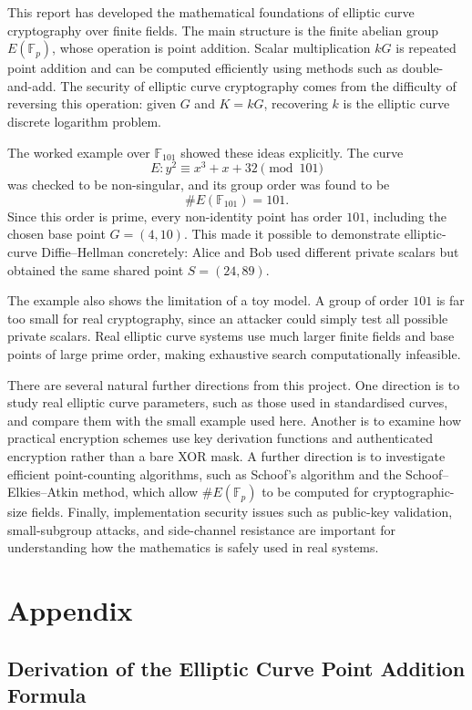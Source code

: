 \documentclass[12pt,a4paper]{article}
\begin{document}
This report has developed the mathematical foundations of elliptic curve cryptography over finite fields. The main structure is the finite abelian group \(E(\mathbb{F}_p)\), whose operation is point addition. Scalar multiplication \(kG\) is repeated point addition and can be computed efficiently using methods such as double-and-add. The security of elliptic curve cryptography comes from the difficulty of reversing this operation: given \(G\) and \(K=kG\), recovering \(k\) is the elliptic curve discrete logarithm problem.

The worked example over \(\mathbb{F}_{101}\) showed these ideas explicitly. The curve
\[E:y^2\equiv x^3+x+32\pmod {101}\]
was checked to be non-singular, and its group order was found to be
\[\#E(\mathbb{F}_{101})=101.\]
Since this order is prime, every non-identity point has order \(101\), including the chosen base point \(G=(4,10)\). This made it possible to demonstrate elliptic-curve Diffie--Hellman concretely: Alice and Bob used different private scalars but obtained the same shared point \(S=(24,89)\).

The example also shows the limitation of a toy model. A group of order \(101\) is far too small for real cryptography, since an attacker could simply test all possible private scalars. Real elliptic curve systems use much larger finite fields and base points of large prime order, making exhaustive search computationally infeasible.

There are several natural further directions from this project. One direction is to study real elliptic curve parameters, such as those used in standardised curves, and compare them with the small example used here. Another is to examine how practical encryption schemes use key derivation functions and authenticated encryption rather than a bare XOR mask. A further direction is to investigate efficient point-counting algorithms, such as Schoof's algorithm and the Schoof--Elkies--Atkin method, which allow \(\#E(\mathbb{F}_p)\) to be computed for cryptographic-size fields. Finally, implementation security issues such as public-key validation, small-subgroup attacks, and side-channel resistance are important for understanding how the mathematics is safely used in real systems.

\printbibliography

\appendix
\section{Appendix}
\subsection{Derivation of the Elliptic Curve Point Addition Formula}
\end{document}
